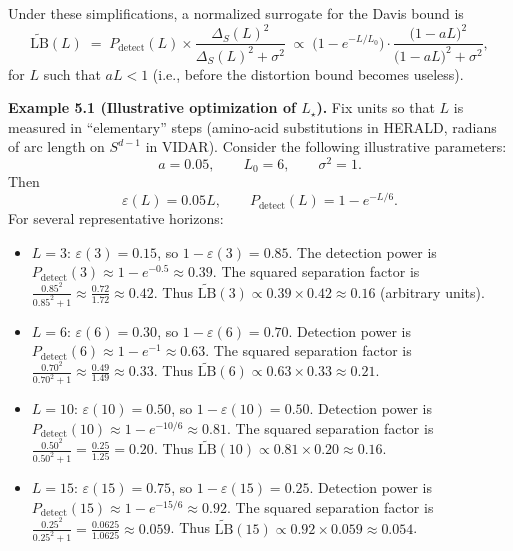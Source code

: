 \documentclass[11pt]{article}
\theoremstyle{remark}
\theoremstyle{plain}
\begin{document}
Under these simplifications, a normalized surrogate for the Davis bound is
\begin{equation}
  \label{eq:toy-LB}
  \widetilde{\mathrm{LB}}(L)
  \;=\;
  P_{\mathrm{detect}}(L)
  \times
  \frac{\Delta_S(L)^2}{\Delta_S(L)^2 + \sigma^2}
  \;\propto\;
  \bigl(1 - e^{-L / L_0}\bigr)
  \cdot
  \frac{\bigl(1 - aL\bigr)^2}{\bigl(1 - aL\bigr)^2 + \sigma^2},
\end{equation}
for $L$ such that $aL < 1$ (i.e., before the distortion bound becomes useless).

\begin{mdframed}[linewidth=0.6pt]
\noindent\textbf{Example 5.1 (Illustrative optimization of $L_\star$).}
Fix units so that $L$ is measured in ``elementary'' steps (amino-acid substitutions in HERALD,
radians of arc length on $S^{d-1}$ in VIDAR). Consider the following illustrative parameters:
\[
a = 0.05, \qquad
L_0 = 6, \qquad
\sigma^2 = 1.
\]
Then
\[
\varepsilon(L) = 0.05 L, \qquad
P_{\mathrm{detect}}(L) = 1 - e^{-L/6}.
\]
For several representative horizons:
\begin{itemize}[leftmargin=*]
  \item $L = 3$: $\varepsilon(3) = 0.15$, so $1-\varepsilon(3) = 0.85$. The detection power is
  $P_{\mathrm{detect}}(3) \approx 1 - e^{-0.5} \approx 0.39$. The squared separation factor is
  $\frac{0.85^2}{0.85^2 + 1} \approx \frac{0.72}{1.72} \approx 0.42$. Thus
  $\widetilde{\mathrm{LB}}(3) \propto 0.39 \times 0.42 \approx 0.16$ (arbitrary units).

  \item $L = 6$: $\varepsilon(6) = 0.30$, so $1-\varepsilon(6) = 0.70$. Detection power is
  $P_{\mathrm{detect}}(6) \approx 1 - e^{-1} \approx 0.63$. The squared separation factor is
  $\frac{0.70^2}{0.70^2 + 1} \approx \frac{0.49}{1.49} \approx 0.33$. Thus
  $\widetilde{\mathrm{LB}}(6) \propto 0.63 \times 0.33 \approx 0.21$.

  \item $L = 10$: $\varepsilon(10) = 0.50$, so $1-\varepsilon(10) = 0.50$. Detection power is
  $P_{\mathrm{detect}}(10) \approx 1 - e^{-10/6} \approx 0.81$. The squared separation factor is
  $\frac{0.50^2}{0.50^2 + 1} = \frac{0.25}{1.25} = 0.20$. Thus
  $\widetilde{\mathrm{LB}}(10) \propto 0.81 \times 0.20 \approx 0.16$.

  \item $L = 15$: $\varepsilon(15) = 0.75$, so $1-\varepsilon(15) = 0.25$. Detection power is
  $P_{\mathrm{detect}}(15) \approx 1 - e^{-15/6} \approx 0.92$. The squared separation factor is
  $\frac{0.25^2}{0.25^2 + 1} = \frac{0.0625}{1.0625} \approx 0.059$. Thus
  $\widetilde{\mathrm{LB}}(15) \propto 0.92 \times 0.059 \approx 0.054$.
\end{itemize}


\end{mdframed}
\end{document}
